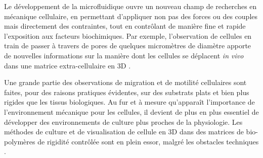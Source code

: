 \documentclass{report}
\begin{document}
Le développement de la microfluidique ouvre un nouveau champ de recherches en mécanique cellulaire, en permettant d'appliquer non pas des forces ou des couples mais directement des contraintes, tout en contrôlant de manière fine et rapide l'exposition aux facteurs biochimiques. 
Par exemple, l'observation de cellules en train de passer à travers de pores de quelques micromètres de diamètre apporte de nouvelles informations sur la manière dont les cellules se déplacent \textit{in vivo} dans une matrice extra-cellulaire en 3D \cite{aubry}. 

Une grande partie des observations de migration et de motilité cellulaires sont faites, pour des raisons pratiques évidentes, sur des substrats plats et bien plus rigides que les tissus biologiques. Au fur et à mesure qu'apparaît l'importance de l'environnement mécanique pour les cellules, il devient de plus en plus essentiel de développer des environnements de culture plus proches de la physiologie. Les méthodes de culture et de visualisation de cellule en 3D dans des matrices de bio-polymères de rigidité contrôlée sont en plein essor, malgré les obstacles techniques \cite{fischer}. 
\end{document}
